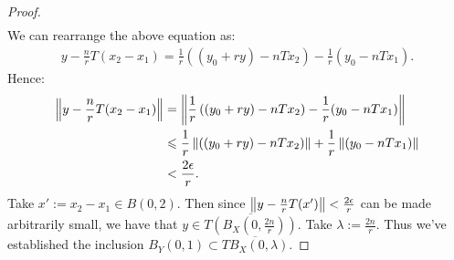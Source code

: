 \begin{proof}
\begin{equation*}
\begin{split}
                \end{split}
                \end{equation*}
            We can rearrange the above equation as:
                \begin{equation*}
                \begin{split}
                    y - \frac{n}{r}T(x_2 - x_1) = \frac{1}{r} \left( (y_0 + ry) - n T x_2 \right) - \frac{1}{r}(y_0 - n Tx_1).
                \end{split}
                \end{equation*}
            Hence:
                \begin{equation*}
                \begin{split}
                    \left\lVert y - \frac{n}{r}T(x_2 - x_1) \right\rVert
                    & = \left\lVert \frac{1}{r} \left( (y_0 + ry) - n T x_2 \right) - \frac{1}{r}(y_0 - n Tx_1) \right\rVert \\
                    & \leqslant \frac{1}{r}\left\lVert  \left( (y_0 + ry) - n T x_2 \right)\right\rVert + \frac{1}{r}\left\lVert (y_0 - n Tx_1) \right\rVert \\
                    & < \frac{2\epsilon}{r}.
                \end{split}
                \end{equation*}
            Take $x' := x_2 - x_1 \in B(0,2)$. Then since $\left\lVert y - \frac{n}{r}T(x') \right\rVert < \frac{2\epsilon}{r}$ can be made arbitrarily small, we have that $y \in \overline{T(B_X(0,\frac{2n}{r}))}$. Take $\lambda := \frac{2n}{r}$. Thus we've established the inclusion $B_Y(0,1) \subset \overline{ TB_X(0,\lambda)}$.


\end{proof}
